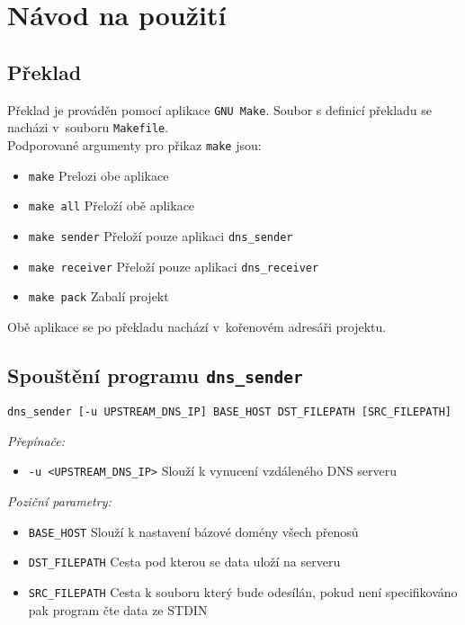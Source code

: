 \section{Návod na použití} \label{sec:usage}

\subsection{Překlad}\label{section:compilation}

Překlad je prováděn pomocí aplikace \texttt{GNU Make}.
Soubor s definicí překladu se nacházi v~souboru \texttt{Makefile}.\\
Podporované argumenty pro přikaz \texttt{make} jsou:

\begin{itemize}
    \item \texttt{make} Prelozi obe aplikace
    \item \texttt{make all} Přeloží obě aplikace
    \item \texttt{make sender} Přeloží pouze aplikaci \texttt{dns\_sender}
    \item \texttt{make receiver} Přeloží pouze aplikaci \texttt{dns\_receiver}
    \item \texttt{make pack} Zabalí projekt
\end{itemize}

Obě aplikace se po překladu nachází v~kořenovém adresáři projektu.

\subsection{Spouštění programu \texttt{dns\_sender}}

\texttt{dns\_sender [-u UPSTREAM\_DNS\_IP] {BASE\_HOST} {DST\_FILEPATH} [SRC\_FILEPATH]}

\textit{Přepínače:}

\begin{itemize}
    \item \texttt{-u <UPSTREAM\_DNS\_IP>} Slouží k vynucení vzdáleného DNS serveru
\end{itemize}

\textit{Poziční parametry:}

\begin{itemize}
    \item \texttt{BASE\_HOST} Slouží k nastavení bázové domény všech přenosů
    \item \texttt{DST\_FILEPATH} Cesta pod kterou se data uloží na serveru
    \item \texttt{SRC\_FILEPATH} Cesta k souboru který bude odesílán, pokud není specifikováno pak program čte data ze STDIN
\end{itemize}

